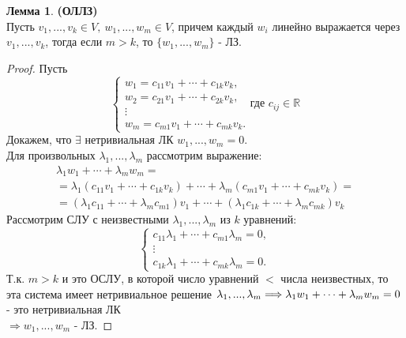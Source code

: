 \documentclass[a4paper, 12pt]{article}
\newcommand{\R}{\mathbb R}
\newcounter{lemcount}
\newcounter{lemcount2}
\theoremstyle{definition}
\newtheorem{lemmanum}[lemcount]{Лемма}
\begin{document}
  \begin{lemmanum} \textbf{(ОЛЛЗ)}  \\
    Пусть $v_1,...,v_k \in V, \ w_1,...,w_m \in V$, причем каждый $w_i$ линейно выражается через $v_1,...,v_k$, тогда если $m>k$, то $\{w_1,...,w_m\}$ - ЛЗ.  
  \end{lemmanum} 
  \begin{proof}
    Пусть 
    $$\begin{cases}
      w_1 = c_{11}v_1+\cdots+c_{1k}v_k, \\
      w_2 = c_{21}v_1+\cdots+c_{2k}v_k, \\
      \vdots \\
      w_m = c_{m1}v_1+\cdots+c_{mk}v_k.
    \end{cases}
    \text{где } c_{ij} \in \R
    $$
    Докажем, что $\exists$ нетривиальная ЛК $w_1,...,w_m=0$. \\
    Для произвольных $\lambda_1,...,\lambda_m$ рассмотрим выражение: 
    \begin{multline*}
      \lambda_1w_1 +\cdots+\lambda_mw_m = \\ = \lambda_1(c_{11}v_1+\cdots+c_{1k}v_k) + \cdots + \lambda_m(c_{m1}v_1+\cdots+c_{mk}v_k) = \\ = (\lambda_1c_{11}+\cdots+\lambda_mc_{m1})v_1+\cdots+(\lambda_1c_{1k}+\cdots+\lambda_mc_{mk})v_k 
    \end{multline*}
    Рассмотрим СЛУ с неизвестными $\lambda_1,...,\lambda_m$ из $k$ уравнений:
    $$\begin{cases}
      c_{11}\lambda_1+\cdots+c_{m1}\lambda_m=0, \\
      \vdots \\
      c_{1k}\lambda_1+\cdots+c_{mk}\lambda_m=0.
    \end{cases}$$ 
    Т.к. $m>k$ и это ОСЛУ, в которой число уравнений $<$ числа неизвестных, то эта система имеет нетривиальное решение 
    $\lambda_1,...,\lambda_m \\ \Longrightarrow \lambda_1w_1+\cdots+\lambda_mw_m = 0$ - это нетривиальная ЛК \\ $\Longrightarrow w_1,...,w_m$ - ЛЗ. 
  \end{proof} 
\end{document}
